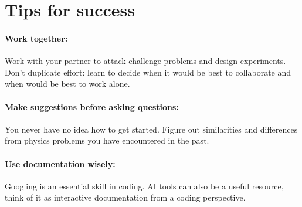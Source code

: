 \section*{Tips for success}

\paragraph{Work together:} Work with your partner to attack challenge problems and design experiments. Don't duplicate effort: learn to decide when it would be best to collaborate and when would be best to work alone.

\paragraph{Make suggestions before asking questions:} You never have no idea how to get started. Figure out similarities and differences from physics problems you have encountered in the past.

\paragraph{Use documentation wisely:} Googling is an essential skill in coding. AI tools can also be a useful resource, think of it as interactive documentation from a coding perspective.
